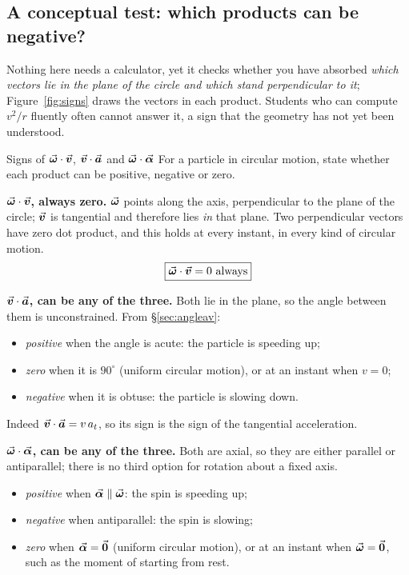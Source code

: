 \medskip
\subsection{A conceptual test: which products can be negative?}

Nothing here needs a calculator, yet it checks whether you have absorbed \emph{which vectors lie in the
plane of the circle and which stand perpendicular to it}; Figure~\ref{fig:signs} draws the vectors in
each product. Students who can compute $v^{2}/r$ fluently
often cannot answer it, a sign that the geometry has not yet been understood.


\begin{figure}[htbp]
\centering
{}
\end{figure}

\begin{exbox}{Signs of $\vec{\bm{\omega}}\cdot\vec{\bm{v}}$, $\vec{\bm{v}}\cdot\vec{\bm{a}}$ and $\vec{\bm{\omega}}\cdot\vec{\bm{\alpha}}$}
For a particle in circular motion, state whether each product can be positive, negative or zero.

 \textbf{$\vec{\bm{\omega}}\cdot\vec{\bm{v}}$, always zero.} $\vec{\bm{\omega}}$ points along the axis, perpendicular to
the plane of the circle; $\vec{\bm{v}}$ is tangential and therefore lies \emph{in} that plane. Two perpendicular
vectors have zero dot product, and this holds at every instant, in every kind of circular motion.
\[
\boxed{\vomega\cdot\vv=0\ \text{always}}
\]

 \textbf{$\vec{\bm{v}}\cdot\vec{\bm{a}}$, can be any of the three.} Both lie in the plane, so the angle
between them is unconstrained. From \S\ref{sec:angleav}:
\begin{itemize}
\item \emph{positive} when the angle is acute: the particle is speeding up;
\item \emph{zero} when it is $90^\circ$ (uniform circular motion), or at an instant when $v=0$;
\item \emph{negative} when it is obtuse: the particle is slowing down.
\end{itemize}
Indeed $\vec{\bm{v}}\cdot\vec{\bm{a}}=v\,a_t$, so its sign is the sign of the tangential acceleration.

 \textbf{$\vec{\bm{\omega}}\cdot\vec{\bm{\alpha}}$, can be any of the three.} Both are axial, so they are either
parallel or antiparallel; there is no third option for rotation about a fixed axis.
\begin{itemize}
\item \emph{positive} when $\vec{\bm{\alpha}}\parallel\vec{\bm{\omega}}$: the spin is speeding up;
\item \emph{negative} when antiparallel: the spin is slowing;
\item \emph{zero} when $\vec{\bm{\alpha}}=\vec{\bm{0}}$ (uniform circular motion), or at an instant when
      $\vec{\bm{\omega}}=\vec{\bm{0}}$, such as the moment of starting from rest.
\end{itemize}
\end{exbox}


